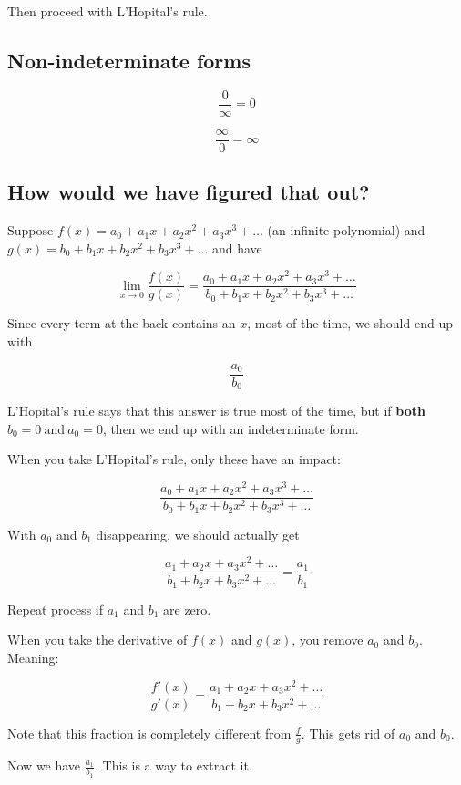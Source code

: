 \documentclass[12pt]{article}
\theoremstyle{plain}
\theoremstyle{remark}
\theoremstyle{definition}
\begin{document}
Then proceed with L'Hopital's rule.


\subsection{Non-indeterminate forms}

\[\frac{0}{\infty} = 0\]

\[\frac{\infty}{0} = \infty\]


\subsection{How would we have figured that
out?}

Suppose \(f(x) = a_{0} + a_{1}x + a_{2}x^{2} + a_{3}x^{3} + \ldots\) (an
infinite polynomial) and
\(g(x) = b_{0} + b_{1}x + b_{2}x^{2} + b_{3}x^{3} + \ldots\) and have

\[\lim_{x \rightarrow 0}\frac{f(x)}{g(x)} = \frac{a_{0} + a_{1}x + a_{2}x^{2} + a_{3}x^{3} + \ldots}{b_{0} + b_{1}x + b_{2}x^{2} + b_{3}x^{3} + \ldots}\]

Since every term at the back contains an \(x\), most of the time, we
should end up with

\[\frac{a_{0}}{b_{0}}\]

L'Hopital's rule says that this answer is true most of the time, but if
\textbf{both} \(b_{0} = 0\ \text{and}\ a_{0} = 0\), then we end up with
an indeterminate form.

When you take L'Hopital's rule, only these have an impact:

\[\frac{a_{0} + a_{1}x + a_{2}x^{2} + a_{3}x^{3} + \ldots}{b_{0} + b_{1}x + b_{2}x^{2} + b_{3}x^{3} + \ldots}\]

With \(a_{0}\) and \(b_{1}\) disappearing, we should actually get

\[\frac{a_{1} + a_{2}x + a_{3}x^{2} + \ldots}{b_{1} + b_{2}x + b_{3}x^{2} + \ldots} = \frac{a_{1}}{b_{1}}\]

Repeat process if \(a_{1}\) and \(b_{1}\) are zero.

When you take the derivative of \(f(x)\) and \(g(x)\), you remove
\(a_{0}\) and \(b_{0}\). Meaning:

\[\frac{f'(x)}{g'(x)} = \frac{a_{1} + a_{2}x + a_{3}x^{2} + \ldots}{b_{1} + b_{2}x + b_{3}x^{2} + \ldots}\]

Note that this fraction is completely different from \(\frac{f}{g}\).
This gets rid of \(a_{0}\) and \(b_{0}\).

Now we have \(\frac{a_{1}}{b_{1}}\). This is a way to extract it.
\end{document}
